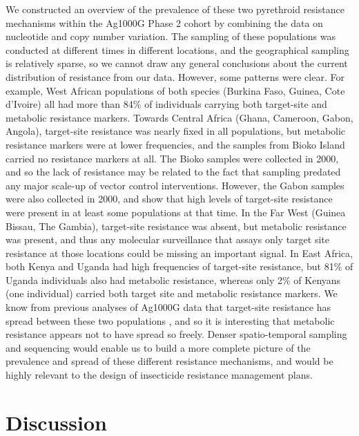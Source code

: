 \documentclass[a4paper,11pt,abstracton,hidelinks]{scrartcl}
\begin{document}
We constructed an overview of the prevalence of these two pyrethroid resistance mechanisms within the Ag1000G Phase 2 cohort by combining the data on nucleotide and copy number variation.
%
The sampling of these populations was conducted at different times in different locations, and the geographical sampling is relatively sparse, so we cannot draw any general conclusions about the current distribution of resistance from our data.
%
However, some patterns were clear.
%
For example, West African populations of both species (Burkina Faso, Guinea, Cote d'Ivoire) all had more than 84\% of individuals carrying both target-site and metabolic resistance markers.
%
Towards Central Africa (Ghana, Cameroon, Gabon, Angola), target-site resistance was nearly fixed in all populations, but metabolic resistance markers were at lower frequencies, and the samples from Bioko Island carried no resistance markers at all.
%
The Bioko samples were collected in 2000, and so the lack of resistance may be related to the fact that sampling predated any major scale-up of vector control interventions.
%
However, the Gabon samples were also collected in 2000, and show that high levels of target-site resistance were present in at least some populations at that time.
%
In the Far West (Guinea Bissau, The Gambia), target-site resistance was absent, but metabolic resistance was present, and thus any molecular surveillance that assays only target site resistance at those locations could be missing an important signal.
%
In East Africa, both Kenya and Uganda had high frequencies of target-site resistance, but 81\% of Uganda individuals also had metabolic resistance, whereas only 2\% of Kenyans (one individual) carried both target site and metabolic resistance markers.
%
We know from previous analyses of Ag1000G data that target-site resistance has spread between these two populations \cite{Ag1000gConsortium2017}, and so it is interesting that metabolic resistance appears not to have spread so freely.
%
Denser spatio-temporal sampling and sequencing would enable us to build a more complete picture of the prevalence and spread of these different resistance mechanisms, and would be highly relevant to the design of insecticide resistance management plans.



\section*{Discussion}
\end{document}
